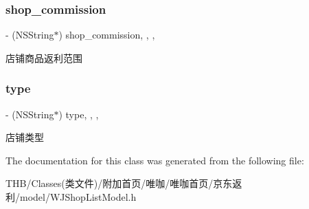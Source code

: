 \subsubsection{\texorpdfstring{shop\+\_\+commission}{shop\_commission}}
{\footnotesize\ttfamily -\/ (N\+S\+String$\ast$) shop\+\_\+commission\hspace{0.3cm}{\ttfamily [read]}, {\ttfamily [write]}, {\ttfamily [nonatomic]}, {\ttfamily [copy]}}

店铺商品返利范围 \mbox{\label{interface_w_j_shop_list_model_a91824d04c31eacd410f558e37dde54ee}} 
\subsubsection{\texorpdfstring{type}{type}}
{\footnotesize\ttfamily -\/ (N\+S\+String$\ast$) type\hspace{0.3cm}{\ttfamily [read]}, {\ttfamily [write]}, {\ttfamily [nonatomic]}, {\ttfamily [copy]}}

店铺类型 

The documentation for this class was generated from the following file\+:\begin{DoxyCompactItemize}
\item 
T\+H\+B/\+Classes(类文件)/附加首页/唯咖/唯咖首页/京东返利/model/W\+J\+Shop\+List\+Model.\+h\end{DoxyCompactItemize}

